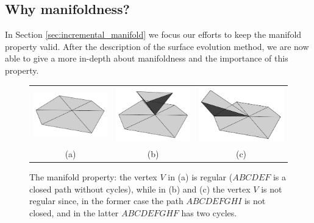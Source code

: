 

\subsection{Why manifoldness?}
\label{subsec:why}
In Section \ref{sec:incremental_manifold} we focus our efforts to keep the manifold property valid.
After the description of the surface evolution method, we are now able to give a more in-depth about manifoldness and the importance of this property.


\begin{figure}[t]
\centering
\begin{tabular}{ccc}
\includegraphics[width=0.28\columnwidth]{img/ch-incr-dens/manifold}&
\includegraphics[width=0.28\columnwidth]{img/ch-incr-dens/notmanifold1}&
\includegraphics[width=0.28\columnwidth]{img/ch-incr-dens/notmanifold2}\\
(a)&(b)&(c)
\end{tabular}
\caption{The manifold property: the vertex $V$ in (a) is regular ($ABCDEF$ is a closed path without cycles), while in (b) and (c) the vertex $V$ is not regular since, in the former case the path $ABCDEFGHI$ is not closed, and in the latter $ABCDEFGHF$ has two cycles.}
\label{fig:vertexManifold}
\end{figure}


